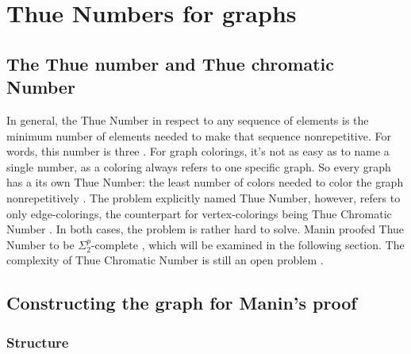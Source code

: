 \documentclass[12pt,a4paper]{article}
\begin{document}
\newpage

\section{Thue Numbers for graphs}
\subsection{The Thue number and Thue chromatic Number}

In general, the Thue Number in respect to any sequence of elements is the minimum number of elements needed to make that sequence nonrepetitive. For words, this number is three \citep{Thue1906}. For graph colorings, it's not as easy as to name a single number, as a coloring always refers to one specific graph. So every graph has a its own Thue Number: the least number of colors needed to color the graph nonrepetitively \citep{Alon2002}. The problem explicitly named Thue Number, however, refers to only edge-colorings, the counterpart for vertex-colorings being Thue Chromatic Number \citep{Schaefer2002}. In both cases, the problem is rather hard to solve. Manin proofed Thue Number to be $\Sigma^p_2$-complete \citep{Manin2008}, which will be examined in the following section. The complexity of Thue Chromatic Number is still an open problem \citep{Schaefer2002}.

\subsection{Constructing the graph for Manin's proof}
\subsubsection{Structure}
\end{document}
